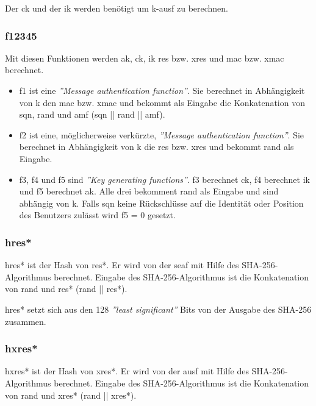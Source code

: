 Der \gls{ck} und der \gls{ik} werden ben\"otigt um \gls{k-ausf} zu berechnen.

\subsubsection{\gls{f12345}}
Mit diesen Funktionen werden \gls{ak}, \gls{ck}, \gls{ik} \gls{res} bzw. \gls{xres} und \gls{mac} bzw. \gls{xmac} berechnet. %
\begin{itemize}
\item f1 ist eine \textit{''Message authentication function''}.
Sie berechnet in Abh\"angigkeit von \gls{k} den \gls{mac} bzw. \gls{xmac} und bekommt als Eingabe die Konkatenation von \gls{sqn}, \gls{rand} und \gls{amf} (\gls{sqn} || \gls{rand} || \gls{amf}). \\
\item f2 ist eine, m\"oglicherweise verk\"urzte, \textit{''Message authentication function''}.
Sie berechnet in Abh\"angigkeit von \gls{k} die \gls{res} bzw. \gls{xres} und bekommt \gls{rand} als Eingabe.
\item f3, f4 und f5 sind \textit{''Key generating functions''}.
f3 berechnet \gls{ck}, f4 berechnet \gls{ik} und f5 berechnet \gls{ak}.
Alle drei bekomment \gls{rand} als Eingabe und sind abh\"angig von \gls{k}.
Falls \gls{sqn} keine R\"uckschl\"usse auf die Identit\"at oder Position des Benutzers zul\"asst wird f5 = 0 gesetzt.
\end{itemize}

\subsubsection{\gls{hres*}}
\gls{hres*} ist der Hash von \gls{res*}.
Er wird von der \gls{seaf} mit Hilfe des SHA-256-Algorithmus berechnet. %
Eingabe des SHA-256-Algorithmus ist die Konkatenation von \gls{rand} und \gls{res*} (\gls{rand} || \gls{res*}).

\gls{hres*} setzt sich aus den 128 \textit{''least significant''} Bits von der Ausgabe des SHA-256 zusammen.

\subsubsection{\gls{hxres*}}
\gls{hxres*} ist der Hash von \gls{xres*}.
Er wird von der \gls{ausf} mit Hilfe des SHA-256-Algorithmus berechnet. %
Eingabe des SHA-256-Algorithmus ist die Konkatenation von \gls{rand} und \gls{xres*} (\gls{rand} || \gls{xres*}).

